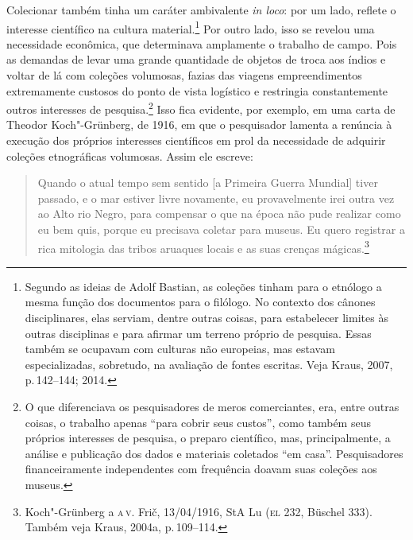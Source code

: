 Colecionar também tinha um caráter ambivalente \textit{in loco}: por um
lado, reflete o interesse científico na cultura material.\footnote{Segundo
  as ideias de Adolf Bastian, as coleções tinham para o etnólogo a mesma
  função dos documentos para o filólogo. No contexto dos cânones
  disciplinares, elas serviam, dentre outras coisas, para estabelecer
  limites às outras disciplinas e para afirmar um terreno próprio de
  pesquisa. Essas também se ocupavam com culturas não europeias, mas
  estavam especializadas, sobretudo, na avaliação de fontes escritas.
  Veja Kraus, 2007, p.\,142--144; 2014.} Por outro lado, isso se revelou
uma necessidade econômica, que determinava amplamente o trabalho de
campo. Pois as demandas de levar uma grande quantidade de objetos de
troca aos índios e voltar de lá com coleções volumosas, fazias das
viagens empreendimentos extremamente custosos do ponto de vista
logístico e restringia constantemente outros interesses de
pesquisa.\footnote{O que diferenciava os pesquisadores de meros
  comerciantes, era, entre outras coisas, o trabalho apenas ``para
  cobrir seus custos'', como também seus próprios interesses de
  pesquisa, o preparo científico, mas, principalmente, a análise e
  publicação dos dados e materiais coletados ``em casa''. Pesquisadores
  financeiramente independentes com frequência doavam suas coleções aos
  museus.} Isso fica evidente, por exemplo, em uma carta de Theodor
Koch"-Grünberg, de 1916, em que o pesquisador lamenta a renúncia à
execução dos próprios interesses científicos em prol da necessidade de
adquirir coleções etnográficas volumosas. Assim ele escreve: 

\begin{quote}
Quando o atual tempo sem sentido {[}a Primeira Guerra Mundial{]} tiver passado,
e o mar estiver livre novamente, eu provavelmente irei outra vez ao Alto
rio Negro, para compensar o que na época não pude realizar como eu bem
quis, porque eu precisava coletar para museus. Eu quero registrar a
rica mitologia das tribos aruaques locais e as suas crenças
mágicas.\footnote{Koch"-Grünberg a \textsc{a}\,\textsc{v}. Frič, 13/04/1916, StA Lu (\textsc{el} 232, Büschel 333). Também veja Kraus, 2004a, p.\,109--114.}
\end{quote}

